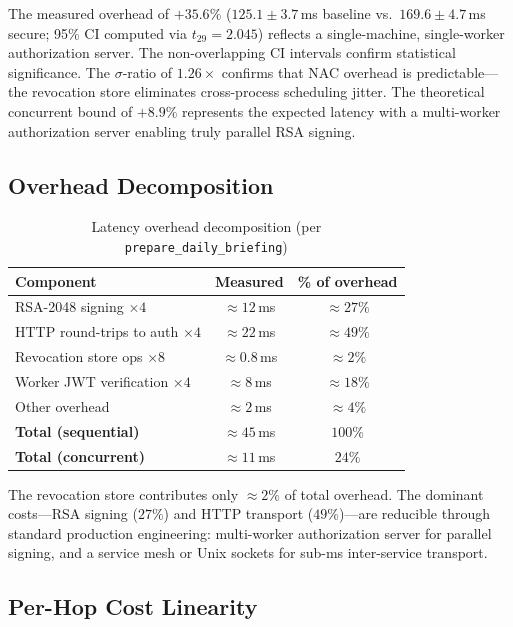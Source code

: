 \documentclass[journal]{IEEEtran}
\begin{document}
The measured overhead of $+35.6\%$ ($125.1 \pm 3.7$\,ms baseline vs.\
$169.6 \pm 4.7$\,ms secure; 95\% CI computed via $t_{29} = 2.045$) reflects
a single-machine, single-worker authorization server. The non-overlapping CI
intervals confirm statistical significance. The $\sigma$-ratio of $1.26\times$
confirms that NAC overhead is predictable---the revocation store eliminates
cross-process scheduling jitter. The theoretical concurrent bound of $+8.9\%$
represents the expected latency with a multi-worker authorization server enabling
truly parallel RSA signing.

\subsection{Overhead Decomposition}
\label{sec:overhead}

\begin{table}[h]
\caption{Latency overhead decomposition (per \texttt{prepare\_daily\_briefing})}
\label{tab:decomp}
\centering
\footnotesize
\begin{tabular}{lcc}
\toprule
\textbf{Component} & \textbf{Measured} & \textbf{\% of overhead} \\
\midrule
RSA-2048 signing $\times 4$         & $\approx 12$\,ms  & $\approx 27\%$ \\
HTTP round-trips to auth $\times 4$ & $\approx 22$\,ms  & $\approx 49\%$ \\
Revocation store ops $\times 8$     & $\approx 0.8$\,ms & $\approx 2\%$  \\
Worker JWT verification $\times 4$  & $\approx 8$\,ms   & $\approx 18\%$ \\
Other overhead                      & $\approx 2$\,ms   & $\approx 4\%$  \\
\midrule
\textbf{Total (sequential)}         & $\approx 45$\,ms  & $100\%$ \\
\textbf{Total (concurrent)}         & $\approx 11$\,ms  & $24\%$  \\
\bottomrule
\end{tabular}
\end{table}

The revocation store contributes only $\approx 2\%$ of total overhead. The
dominant costs---RSA signing ($27\%$) and HTTP transport ($49\%$)---are
reducible through standard production engineering: multi-worker authorization
server for parallel signing, and a service mesh or Unix sockets for sub-ms
inter-service transport.

\subsection{Per-Hop Cost Linearity}
\end{document}
